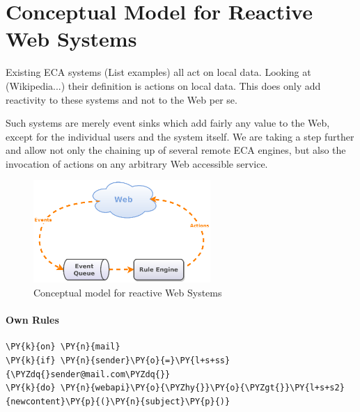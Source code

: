 
\chapter{Conceptual Model for Reactive Web Systems}
%


%





Existing ECA systems (List examples) all act on local data.
Looking at (Wikipedia...) their definition is actions on local data.
This does only add reactivity to these systems and not to the Web per se.

Such systems are merely event sinks which add fairly any value to the Web, except for the individual users and the system itself.
We are taking a step further and allow not only the chaining up of several remote ECA engines, but also the invocation of actions on any arbitrary Web accessible service.

\begin{figure}[h!]
  \centering
  \includegraphics[width=0.6\textwidth]{figures/Conceptual_Model}
  \caption{Conceptual model for reactive Web Systems}
  \label{fig:Architecture_woEP}
\end{figure}


\newpage

\subsubsection{Own Rules}
\begin{Verbatim}[fontsize=\small,commandchars=\\\{\}]
\PY{k}{on} \PY{n}{mail}
\PY{k}{if} \PY{n}{sender}\PY{o}{=}\PY{l+s+ss}{\PYZdq{}sender@mail.com\PYZdq{}}
\PY{k}{do} \PY{n}{webapi}\PY{o}{\PYZhy{}}\PY{o}{\PYZgt{}}\PY{l+s+s2}{newcontent}\PY{p}{(}\PY{n}{subject}\PY{p}{)}
\end{Verbatim}

